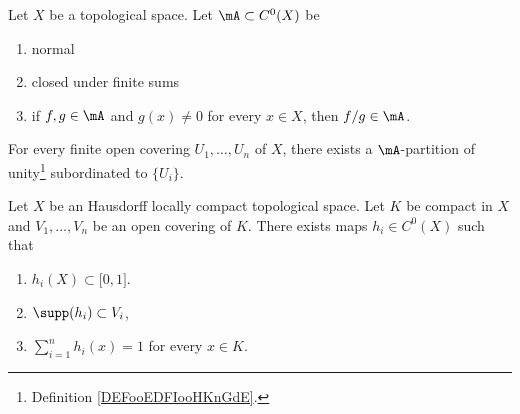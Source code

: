 \begin{theorem}       \label{THOooUGQCooFVySMP}
	Let \( X\) be a topological space. Let \( \mA\subset C^0(X)\) be
	\begin{enumerate}
		\item
		      normal
		\item
		      closed under finite sums
		\item
		      if \( f,g\in\mA\) and \( g(x)\neq 0\) for every \( x\in X\), then \( f/g\in \mA\).
	\end{enumerate}
	For every finite open covering \( U_1,\ldots, U_n\) of \( X\), there exists a \( \mA\)-partition of unity\footnote{Definition \ref{DEFooEDFIooHKnGdE}.} subordinated to \( \{ U_i \}\).
\end{theorem}

\begin{proposition}	\label{PROPooWWBLooJAUjnw}
	Let \( X\) be an Hausdorff locally compact topological space. Let \( K\) be compact in \( X\) and \( V_1,\ldots,V_n\) be an open covering of \( K\). There exists maps \( h_i\in C^0(X) \) such that
	\begin{enumerate}
		\item
		      \( h_i(X)\subset\mathopen[ 0,1\mathclose]\).
		\item
		      \( \supp(h_i)\subset V_i\),
		\item
		      \( \sum_{i=1}^nh_i(x)=1\) for every \( x\in K\).
	\end{enumerate}
\end{proposition}

